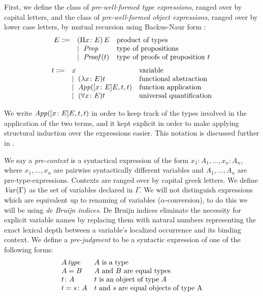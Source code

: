 First, we define the class of \textit{pre-well-formed type expressions},
ranged over by capital letters, 
and the class of \textit{pre-well-formed object expressions},
ranged over by lower case letters, by mutual recursion using Backus-Naur form \cite{aho2007}: 
\[
\begin{array}{lll}
  E \Coloneqq & (\Pi x \colon E)\, E & \text{product of types} \\
        &  \mid\  \operatorname{\mathit{Prop}} & \text{type of propositions} \\
        &  \mid\  \operatorname{\mathit{Proof}}(t) & \text{type of proofs of proposition } t
\end{array}
\]
\[
\begin{array}{lll}
    t \Coloneqq & x & \text{variable} \\
        &  \mid\  (\lambda x \colon E) t & \text{functional abstraction} \\
        &  \mid\  \operatorname{\mathit{App}}([x \colon E ] E, t, t) & \text{function application} \\
        &  \mid\  (\forall x \colon E) t & \text{universal quantification} 

\end{array}
\]
\begin{remark}
    We write $\operatorname{\mathit{App}}([x \colon E] E, t, t)$ in order to keep track of the types involved in the application of the two terms, 
    and it kept explicit in order to make applying structural induction over the expressions easier. 
    This notation is discussed further in \cite{streicher}.  
\end{remark}
We say a \textit{pre-context} is a syntactical expression of the form 
$x_1 \colon A_1, \dots, x_n \colon A_n$, where $x_1, \dots, x_n$ are pairwise 
syntactically different variables and $A_1, \dots, A_n$ are pre-type-expressions.
Contexts are ranged over by capital greek letters.
We define $\operatorname{\mathit{Var}}(\Gamma)$ as the set of variables declared in $\Gamma$.
We will not distinguish expressions which are equivalent up to renaming of variables
($\alpha$-conversion), to do this we will be using \textit{de Bruijn indices}.
De Bruijn indices eliminate the necessity for explicit variable names by replacing them with natural 
numbers representing the exact lexical depth between a variable's localized occurrence and its binding context.
We define a \textit{pre-judgment} to be a syntactic expression of one of the following forms:
\[
\begin{array}{ll}
    A \type & A \text{ is a type} \\
    A = B & A \text{ and } B \text{ are equal types} \\
    t \colon A & t \text{ is an object of type } A \\
    t = s \colon A & t \text{ and } s \text{ are equal objects of type } $A$
\end{array}
\]
